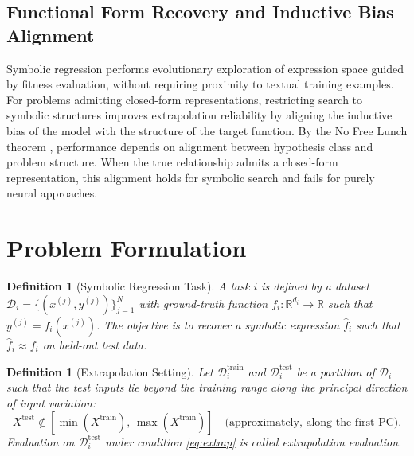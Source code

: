 \documentclass[twoside,11pt]{article}
\newtheorem{definition}[theorem]{Definition}
\begin{document}
\subsection{Functional Form Recovery and Inductive Bias Alignment}
\label{sec:theory_recovery}

Symbolic regression performs evolutionary exploration of expression space guided by fitness evaluation, without requiring proximity to textual training examples. For problems admitting closed-form representations, restricting search to symbolic structures improves extrapolation reliability by aligning the inductive bias of the model with the structure of the target function. By the No Free Lunch theorem \citep{wolpert1997no}, performance depends on alignment between hypothesis class and problem structure. When the true relationship admits a closed-form representation, this alignment holds for symbolic search and fails for purely neural approaches.

\section{Problem Formulation}
\label{sec:problem}

\begin{definition}[Symbolic Regression Task]
A task $i$ is defined by a dataset $\mathcal{D}_i = \{(x^{(j)}, y^{(j)})\}_{j=1}^{N}$
with ground-truth function $f_i: \mathbb{R}^{d_i} \to \mathbb{R}$ such that
$y^{(j)} = f_i(x^{(j)})$.  The objective is to recover a symbolic expression
$\hat{f}_i$ such that $\hat{f}_i \approx f_i$ on held-out test data.
\end{definition}

\begin{definition}[Extrapolation Setting]
Let $\mathcal{D}^{\mathrm{train}}_i$ and $\mathcal{D}^{\mathrm{test}}_i$ be a
partition of $\mathcal{D}_i$ such that the test inputs lie beyond the training range
along the principal direction of input variation:
\begin{equation}
  X^{\mathrm{test}} \notin [\min(X^{\mathrm{train}}),\, \max(X^{\mathrm{train}})]
  \quad \text{(approximately, along the first PC)}.
  \label{eq:extrap}
\end{equation}
Evaluation on $\mathcal{D}^{\mathrm{test}}_i$ under condition \eqref{eq:extrap}
is called \emph{extrapolation evaluation}.
\end{definition}
\end{document}
